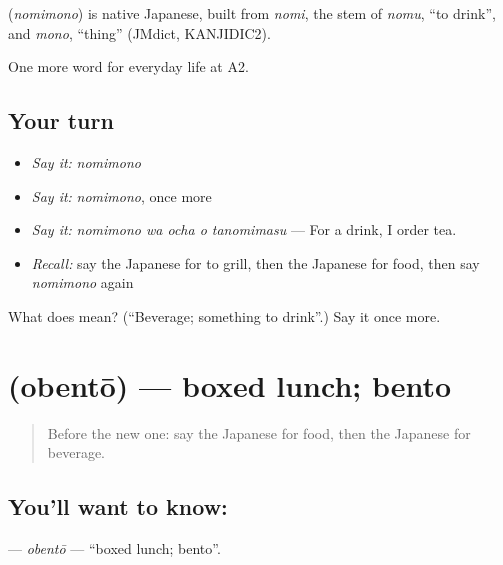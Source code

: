 \begin{cousinweb}
\textbf{} (\emph{nomimono}) is native Japanese, built from \emph{nomi}, the stem of \emph{nomu}, \textquotedblleft{}to drink\textquotedblright{}, and \emph{mono}, \textquotedblleft{}thing\textquotedblright{} (JMdict, KANJIDIC2).
\end{cousinweb}

\begin{grammarlens}[title={What you've built}]
One more word for everyday life at A2.
\end{grammarlens}

\subsection*{Your turn}
\begin{itemize}
\raggedright
  \item \emph{Say it:} \emph{nomimono}
  \item \emph{Say it:} \emph{nomimono}, once more
  \item \emph{Say it:} \emph{nomimono wa ocha o tanomimasu} — For a drink, I order tea.
  \item \emph{Recall:} say the Japanese for to grill, then the Japanese for food, then say \emph{nomimono} again
\end{itemize}

\begin{tcolorbox}[breakable,colback=teal!4,colframe=teal!35!black,title={Before you move on}]
What does  mean? (\textquotedblleft{}Beverage; something to drink\textquotedblright{}.) Say it once more.
\end{tcolorbox}
\section[\texorpdfstring{\ja{おべんとう} (obentō)}{おべんとう (obentō)}]{ (obentō) — boxed lunch; bento}

\label{lesson:JA-C173-obentou}



\begin{quote}
Before the new one: say the Japanese for food, then the Japanese for beverage.
\end{quote}

\subsection*{You'll want to know: }
\textbf{} — \emph{obentō} — \textquotedblleft{}boxed lunch; bento\textquotedblright{}.

